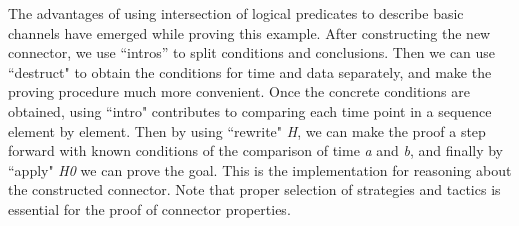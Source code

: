 \documentclass{llncs}
\begin{document}
\begin{example}
The advantages of using intersection of logical predicates to describe basic channels have emerged while proving this example.
After constructing the new connector, we use ``intros'' to split conditions and conclusions. Then we can use ``destruct" to obtain the conditions for time and data separately,
and make the proving procedure much more convenient. Once the concrete conditions are obtained, using ``intro"
contributes to comparing each time point in a sequence element by element. Then by using ``rewrite" \emph{H}, we can make
the proof a step forward with known conditions of the comparison of time \emph{a} and \emph{b}, and finally by
``apply" \emph{H0} we can prove the goal. This is the implementation for reasoning about the constructed connector.
Note that proper selection of strategies and tactics is essential for the proof of connector properties.
\end{example}
\end{document}
